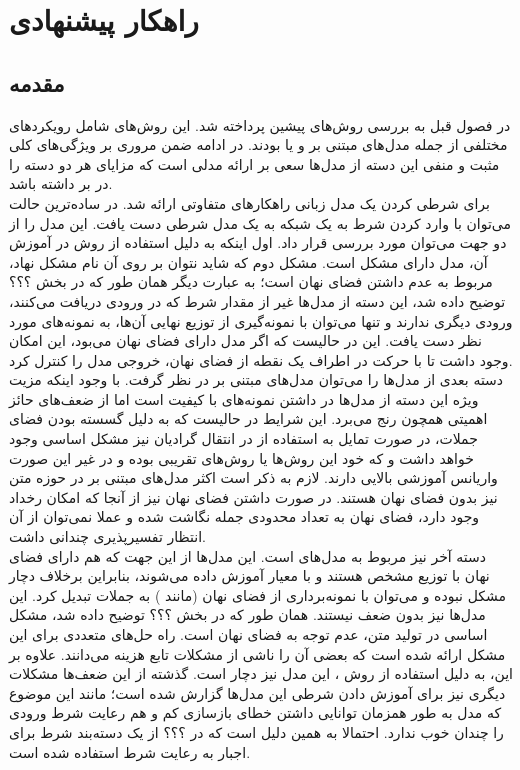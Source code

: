 \chapter{راهکار پیشنهادی}\label{Chap:Chap3}
\minitoc

\section{مقدمه}
در فصول قبل به بررسی روش‌های پیشین پرداخته شد. این روش‌های شامل رویکرد‌های مختلفی از جمله مدل‌های مبتنی بر \gan{} و یا \vae{} بودند. در ادامه ضمن مروری بر ویژگی‌های کلی مثبت و منفی این دسته از مدل‌ها سعی بر ارائه مدلی است که مزایای هر دو دسته را در بر داشته باشد.
\\
برای شرطی کردن یک مدل زبانی راهکارهای متفاوتی ارائه شد. در ساده‌ترین حالت می‌توان با وارد کردن شرط به یک شبکه  به یک مدل شرطی دست یافت. این مدل را از دو جهت می‌توان مورد بررسی قرار داد. اول اینکه به دلیل استفاده از روش \teacherforcing{} در آموزش آن، مدل دارای مشکل \expbias{} است. مشکل دوم که شاید نتوان بر روی آن نام مشکل نهاد، مربوط به عدم داشتن فضای نهان است؛ به عبارت دیگر همان طور که در بخش ؟؟؟ توضیح داده شد، این دسته از مدل‌ها غیر از مقدار شرط که در ورودی دریافت می‌کنند، ورودی دیگری ندارند و تنها می‌توان با نمونه‌گیری از توزیع نهایی آن‌ها، به نمونه‌های مورد نظر دست یافت. این در حالیست که اگر مدل دارای فضای نهان می‌بود، این امکان وجود داشت تا با حرکت در اطراف یک نقطه از فضای نهان، خروجی مدل را کنترل کرد.
\\
دسته بعدی از مدل‌ها را می‌توان مدل‌های مبتنی بر \gan{} در نظر گرفت. با وجود اینکه مزیت ویژه این دسته از مدل‌ها در داشتن  نمونه‌های با کیفیت است اما از ضعف‌های حائز اهمیتی همچون \modecollapse{} رنج می‌برد. این شرایط در حالیست که به دلیل گسسته بودن فضای جملات، در صورت تمایل به استفاده از \gan{} در انتقال گرادیان نیز مشکل اساسی وجود خواهد داشت و که خود این روش‌ها یا روش‌های تقریبی بوده و در غیر این صورت واریانس آموزشی بالایی دارند. لازم به ذکر است اکثر مدل‌های مبتنی بر \gan{} در حوزه متن نیز بدون فضای نهان هستند. در صورت داشتن فضای نهان نیز از آنجا که امکان رخداد \modecollapse{} وجود دارد، فضای نهان به تعداد محدودی جمله نگاشت شده و عملا نمی‌توان از آن انتظار تفسیرپذیری چندانی داشت.
\\
دسته آخر نیز مربوط به مدل‌های \vae{} است. این مدل‌ها از این جهت که هم دارای فضای نهان با توزیع مشخص هستند و با معیار \likelihood{} آموزش داده می‌شوند، بنابراین برخلاف \gan{} دچار مشکل \modecollapse{} نبوده و می‌توان با نمونه‌برداری از فضای نهان (مانند \gan{}) به جملات تبدیل کرد. این مدل‌ها نیز بدون ضعف نیستند. همان طور که در بخش ؟؟؟ توضیح داده شد، مشکل اساسی \vae{} در تولید متن، عدم توجه به فضای نهان است. راه حل‌های متعددی برای این مشکل ارائه شده است که بعضی آن را ناشی از مشکلات تابع هزینه می‌دانند. علاوه بر این، به دلیل استفاده از روش ‌\teacherforcing{}، این مدل نیز دچار \expbias{} است. گذشته از این ضعف‌ها مشکلات دیگری نیز برای آموزش دادن شرطی این مدل‌ها گزارش شده است؛ مانند این موضوع که مدل به طور همزمان توانایی داشتن خطای بازسازی کم و هم رعایت شرط ورودی را چندان خوب ندارد. احتمالا به همین دلیل است که در ؟؟؟ از یک دسته‌بند شرط برای اجبار \decoder{} به رعایت شرط استفاده شده است.

